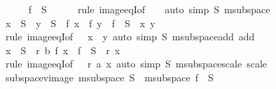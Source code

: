 \begin{isabellebody}
\ \ \isamarkupfalse%
\ {\isachardoublequoteopen}{}\ {\isasymin}\ f\ {\isacharbackquote}{\kern0pt}\ S{\isachardoublequoteclose}\isanewline
\ \ \ \ \isamarkupfalse%
\ {\isacharparenleft}{\kern0pt}rule\ image{\isacharunderscore}{\kern0pt}eqI{\isacharbrackleft}{\kern0pt}of\ {\isacharunderscore}{\kern0pt}\ {\isacharunderscore}{\kern0pt}\ {}{\isacharbrackright}{\kern0pt}{\isacharparenright}{\kern0pt}\ {\isacharparenleft}{\kern0pt}auto\ simp{\isacharcolon}{\kern0pt}\ S\ m{}{\isachardot}{\kern0pt}subspace{\isacharunderscore}{\kern0pt}{}{\isacharparenright}{\kern0pt}\isanewline
\ \ \isamarkupfalse%
\ {\isachardoublequoteopen}x\ {\isasymin}\ S\ {\isasymLongrightarrow}\ y\ {\isasymin}\ S\ {\isasymLongrightarrow}\ f\ x\ {\isacharplus}{\kern0pt}\ f\ y\ {\isasymin}\ f\ {\isacharbackquote}{\kern0pt}\ S{\isachardoublequoteclose}\ \ x\ y\isanewline
\ \ \ \ \isamarkupfalse%
\ {\isacharparenleft}{\kern0pt}rule\ image{\isacharunderscore}{\kern0pt}eqI{\isacharbrackleft}{\kern0pt}of\ {\isacharunderscore}{\kern0pt}\ {\isacharunderscore}{\kern0pt}\ {\isachardoublequoteopen}x\ {\isacharplus}{\kern0pt}\ y{\isachardoublequoteclose}{\isacharbrackright}{\kern0pt}{\isacharparenright}{\kern0pt}\ {\isacharparenleft}{\kern0pt}auto\ simp{\isacharcolon}{\kern0pt}\ S\ m{}{\isachardot}{\kern0pt}subspace{\isacharunderscore}{\kern0pt}add\ add{\isacharparenright}{\kern0pt}\isanewline
\ \ \isamarkupfalse%
\ {\isachardoublequoteopen}x\ {\isasymin}\ S\ {\isasymLongrightarrow}\ r\ {\isacharasterisk}{\kern0pt}b\ f\ x\ {\isasymin}\ f\ {\isacharbackquote}{\kern0pt}\ S{\isachardoublequoteclose}\ \ r\ x\isanewline
\ \ \ \ \isamarkupfalse%
\ {\isacharparenleft}{\kern0pt}rule\ image{\isacharunderscore}{\kern0pt}eqI{\isacharbrackleft}{\kern0pt}of\ {\isacharunderscore}{\kern0pt}\ {\isacharunderscore}{\kern0pt}\ {\isachardoublequoteopen}r\ {\isacharasterisk}{\kern0pt}a\ x{\isachardoublequoteclose}{\isacharbrackright}{\kern0pt}{\isacharparenright}{\kern0pt}\ {\isacharparenleft}{\kern0pt}auto\ simp{\isacharcolon}{\kern0pt}\ S\ m{}{\isachardot}{\kern0pt}subspace{\isacharunderscore}{\kern0pt}scale\ scale{\isacharparenright}{\kern0pt}\isanewline
{}\isamarkupfalse%
%
\endisatagproof
{\isafoldproof}%
%
\isadelimproof
\isanewline
%
\endisadelimproof
\isanewline
{}\isamarkupfalse%
\ subspace{\isacharunderscore}{\kern0pt}vimage{\isacharcolon}{\kern0pt}\ {\isachardoublequoteopen}m{}{\isachardot}{\kern0pt}subspace\ S\ {\isasymLongrightarrow}\ m{}{\isachardot}{\kern0pt}subspace\ {\isacharparenleft}{\kern0pt}f\ {\isacharminus}{\kern0pt}{\isacharbackquote}{\kern0pt}\ S{\isacharparenright}{\kern0pt}{\isachardoublequoteclose}\isanewline

\end{isabellebody}
